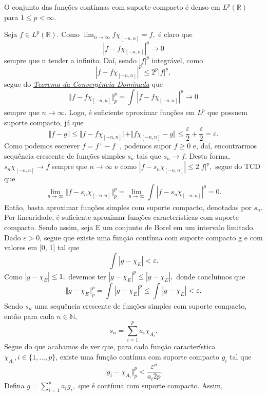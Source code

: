 \documentclass[measure_theory.tex]{subfiles}
\begin{document}
\begin{prop*}
	O conjunto das funções contínuas com suporte compacto é denso em \(L^{p}(\mathbb{R})\) para \(1\leq p < \infty\).
\end{prop*}
\begin{proof*}
	Seja \(f\in L^{p}(\mathbb{R})\). Como \(\lim_{n\to \infty}f \chi_{[-n, n]} = f,\) é claro que
	\[
		|f-f\chi_{[-n, n]}|^{p}\to 0
	\]
	sempre que n tender a infinito. Daí, sendo \(|f|^{p}\) integrável, como
	\[
		|f-f\chi_{[-n, n]}|^{p}\leq 2^{p}|f|^{p},
	\]
	segue do \hyperlink{dominated_convergence}{\textit{Teorema da Convergência Dominada}} que
	\[
		\Vert f - f\chi_{[-n, n]} \Vert_{p}^{p} = \int_{}^{}|f-f\chi_{[-n, n]}|^{p}\to 0
	\]
	sempre que \(n\to \infty\). Logo, é suficiente aproximar funções em \(L^{p}\) que possuem suporte compacto, já que
	\[
		\Vert f -g  \Vert \leq \Vert f - f\chi_{[-n, n]} \Vert + \Vert f\chi_{[-n, n]} - g \Vert \leq \frac{\varepsilon }{2} + \frac{\varepsilon }{2} = \varepsilon.
	\]
	Como podemos escrever \(f=f^{+}-f^{-}\), podemos supor \(f\geq 0\) e, daí, encontrarmos sequência crescente de funções simples \(s_{n}\)
	tais que \(s_{n}\to f\). Desta forma, \(s_{n}\chi_{[-n, n]}\to f\) sempre que \(n\to \infty\) e como \(|f-s_{n}\chi_{[-n, n]}|\leq 2|f|^{p},\) segue do TCD que
	\[
		\lim_{n\to \infty}\Vert f - s_{n}\chi_{[-n, n]} \Vert_{p}^{p} = \lim_{n\to \infty}\int_{}^{}|f-s_{n}\chi_{[-n, n]}|^{p} = 0.
	\]
	Então, basta aproximar funções simples com suporte compacto, denotadas por \(s_{n}\). Por linearidade, é suficiente aproximar funções características com suporte compacto. Sendo assim, seja E um conjunto de Borel em um intervalo limitado. Dado \(\varepsilon  > 0\), segue que existe uma função contínua com suporte compacto g e com valores em [0, 1] tal que
	\[
		\int_{}^{}|g-\chi_{E}|<\varepsilon .
	\]
	Como \(|g-\chi_{E}|\leq 1,\) devemos ter \(|g-\chi_{E}|^{p}\leq |g-\chi_{E}|,\) donde concluímos que
	\[
		\Vert g-\chi_{E} \Vert_{p}^{p} = \int_{}^{}|g-\chi_{E}|^{p} \leq \int_{}^{}|g-\chi_{E}| < \varepsilon .
	\]
	Sendo \(s_{n}\) uma sequência crescente de funções simples com suporte compacto, então para cada \(n\in \mathbb{N},\)
	\[
		s_{n} = \sum\limits_{i=1}^{p}a_{i}\chi_{A_{i}}.
	\]
	Segue do que acabamos de ver que, para cada função característica \(\chi_{A_{i}}, i\in \{1, \dotsc , p\}\), existe uma função contínua com suporte compacto \(g_{i}\) tal que
	\[
		\Vert g_{i}-\chi_{A_{i}} \Vert_{p}^{p}<\frac{\varepsilon ^{p}}{a_{i}2p}.
	\]
	Defina \(g = \sum\limits_{i=1}^{p}a_{i}g_{i},\) que é contínua com suporte compacto. Assim,
	\begin{align*}

\end{align*}
\end{proof*}
\end{document}
